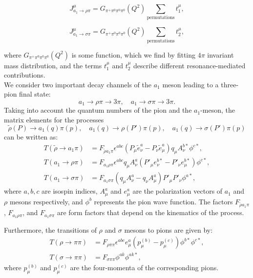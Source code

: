 \documentclass[12pt]{article}
\begin{document}
\begin{equation}
J^\mu_{a_1 \to \rho \pi} = G_{\pi^+\pi^0\pi^0\pi^0} (Q^2) \sum_{\text{permutations}} t_1^\mu,
\end{equation}

\begin{equation}
J^\mu_{a_1 \to \sigma \pi} = G_{\pi^+\pi^0\pi^0\pi^0} (Q^2) \sum_{\text{permutations}} t_2^\mu,
\end{equation}

where $G_{\pi^+\pi^0\pi^0\pi^0} (Q^2)$ is some function, which we find by fitting $4\pi$ invariant mass distribution, and the terms $t_1^\mu$ and $t_2^\mu$ describe different resonance-mediated contributions.\\




We consider two important decay channels of the $a_1$ meson leading to a three-pion final state:
\[
a_1 \to \rho \pi \to 3\pi, \quad a_1 \to \sigma \pi \to 3\pi.
\]
Taking into account the quantum numbers of the pion and the $a_1$-meson, the matrix elements for the processes
\[
\tilde{\rho}(P) \to a_1(q)\pi(p), \quad a_1(q) \to \rho(P')\pi(p), \quad a_1(q) \to \sigma(P')\pi(p)
\]
can be written as:
\begin{align}
    T(\tilde{\rho} \to a_1 \pi) &= F_{\tilde{\rho} a_1 \pi} \epsilon^{abc} (P_{\mu} \tilde{e}^{a}_{\nu} - P_{\nu} \tilde{e}^{a}_{\mu}) q_{\mu} A_{\nu}^{b*} \phi^{c*}, \\
    T(a_1 \to \rho \pi) &= F_{a_1 \rho \pi} \epsilon^{abc} q_{\mu} A_{\nu}^{a} (P'_{\mu} e_{\nu}^{b*} - P'_{\nu} e_{\mu}^{b*}) \phi^{c*}, \\
    T(a_1 \to \sigma \pi) &= F_{a_1 \sigma \pi} (q_{\mu} A_{\nu}^{a} - q_{\nu} A_{\mu}^{a}) P'_{\mu} P'_{\nu} \phi^{a*},
\end{align}
where $a, b, c$ are isospin indices, $A_{\mu}^{a}$ and $e_{\mu}^{a}$ are the polarization vectors of $a_1$ and $\rho$ mesons respectively, and $\phi^b$ represents the pion wave function. The factors $F_{\tilde{\rho} a_1 \pi}$, $F_{a_1 \rho \pi}$, and $F_{a_1 \sigma \pi}$ are form factors that depend on the kinematics of the process.

Furthermore, the transitions of $\rho$ and $\sigma$ mesons to pions are given by:
\begin{align}
    T(\rho \to \pi \pi) &= F_{\rho \pi \pi} \epsilon^{abc} e_{\mu}^{a} (p_{\mu}^{(b)} - p_{\mu}^{(c)}) \phi^{b*} \phi^{c*}, \\
    T(\sigma \to \pi \pi) &= F_{\sigma \pi \pi} \phi^{a k} \phi^{a k*},
\end{align}
where $p_{\mu}^{(b)}$ and $p_{\mu}^{(c)}$ are the four-momenta of the corresponding pions.
\end{document}
